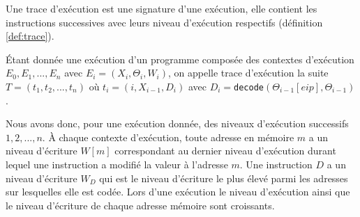 Une trace d'exécution est une signature d'une exécution, elle contient les instructions successives avec leurs niveau d'exécution respectifs (définition \ref{def:trace}).

\begin{defi}
Étant donnée une exécution d'un programme composée des contextes d'exécution $E_0, E_1, ..., E_n$ avec $E_i=(X_i, \Theta_i, W_i)$, on appelle trace d'exécution la suite $T=(t_1, t_2, ..., t_n)$ où $t_i=(i, X_{i-1}, D_i)$ avec $D_i=$\texttt{decode}$(\Theta_{i-1}[eip], \Theta_{i-1})$.
\label{def:trace}
\end{defi}

Nous avons donc, pour une exécution donnée, des niveaux d'exécution successifs $1, 2, ..., n$.
À chaque contexte d'exécution, toute adresse en mémoire $m$ a un niveau d'écriture $W[m]$ correspondant au dernier niveau d'exécution durant lequel une instruction a modifié la valeur à l'adresse $m$.
Une instruction $D$ a un niveau d'écriture $W_D$ qui est le niveau d'écriture le plus élevé parmi les adresses sur lesquelles elle est codée.
Lors d'une exécution le niveau d'exécution ainsi que le niveau d'écriture de chaque adresse mémoire sont croissants.








